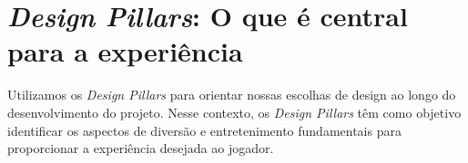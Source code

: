 \section{\textit{Design Pillars}: O que é central para a experiência}

Utilizamos os \textit{Design Pillars} para orientar nossas 
escolhas de design ao longo do desenvolvimento do projeto. 
Nesse contexto, os \textit{Design Pillars} têm como 
objetivo identificar os aspectos de diversão e 
entretenimento fundamentais para proporcionar a 
experiência desejada ao jogador.


